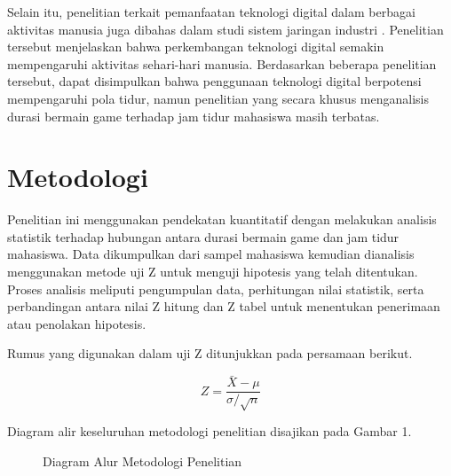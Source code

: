 \documentclass[metlit,article,accept,pdftex,moreauthors]{Definitions/mdpi}
\begin{document}
Selain itu, penelitian terkait pemanfaatan teknologi digital dalam berbagai aktivitas manusia juga dibahas dalam studi sistem jaringan industri \cite{IndustrialWSN2023}. Penelitian tersebut menjelaskan bahwa perkembangan teknologi digital semakin mempengaruhi aktivitas sehari-hari manusia. Berdasarkan beberapa penelitian tersebut, dapat disimpulkan bahwa penggunaan teknologi digital berpotensi mempengaruhi pola tidur, namun penelitian yang secara khusus menganalisis durasi bermain game terhadap jam tidur mahasiswa masih terbatas.

\section{Metodologi}
Penelitian ini menggunakan pendekatan kuantitatif dengan melakukan analisis statistik terhadap hubungan antara durasi bermain game dan jam tidur mahasiswa. Data dikumpulkan dari sampel mahasiswa kemudian dianalisis menggunakan metode uji Z untuk menguji hipotesis yang telah ditentukan. Proses analisis meliputi pengumpulan data, perhitungan nilai statistik, serta perbandingan antara nilai Z hitung dan Z tabel untuk menentukan penerimaan atau penolakan hipotesis. 

Rumus yang digunakan dalam uji Z ditunjukkan pada persamaan berikut.

\begin{equation}
Z = \frac{\bar{X} - \mu}{\sigma / \sqrt{n}}
\end{equation}

Diagram alir keseluruhan metodologi penelitian disajikan pada Gambar 1.

\begin{figure}[H]
\centering
{}
\caption{Diagram Alur Metodologi Penelitian}
\end{figure}
\end{document}
